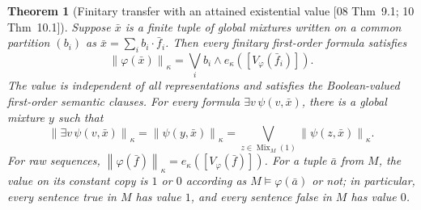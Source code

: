 \documentclass[11pt,letterpaper]{article}
\newtheorem{theorem}{Theorem}[section]
\theoremstyle{definition}
\theoremstyle{remark}
\newcommand{\Mix}{\operatorname{Mix}}
\newcommand{\truth}[1]{\left\lVert #1\right\rVert}
\newcommand{\src}[1]{\textup{[#1]}}
\begin{document}
\begin{theorem}[Finitary transfer with an attained existential value \src{08 Thm~9.1; 10 Thm~10.1}]
\label{fbc:thm:transfer}
Suppose $\bar x$ is a finite tuple of global mixtures written on a
common partition $(b_i)$ as
$\bar x=\sum_i b_i\cdot\bar f_i$. Then every finitary first-order
formula satisfies
\begin{equation}\label{fbc:eq:los-mixing}
 \truth{\varphi(\bar x)}_\kappa
 =\bigvee_i b_i\wedge
       e_\kappa([V_\varphi(\bar f_i)]).
\end{equation}
The value is independent of all representations and satisfies the
Boolean-valued first-order semantic clauses. For every formula
$\exists v\,\psi(v,\bar x)$, there is a global mixture $y$ such that
\begin{equation}\label{fbc:eq:maximum}
 \truth{\exists v\,\psi(v,\bar x)}_\kappa
       =\truth{\psi(y,\bar x)}_\kappa
       =\bigvee_{z\in\Mix_M(1)}\truth{\psi(z,\bar x)}_\kappa.
\end{equation}
For raw sequences, $\truth{\varphi(\bar f)}_\kappa=e_\kappa([V_\varphi(\bar f)])$.
For a tuple $\bar a$ from $M$, the value on its constant copy is $1$ or
$0$ according as $M\models\varphi(\bar a)$ or not; in particular, every
sentence true in $M$ has value $1$, and every sentence false in $M$ has
value $0$.
\end{theorem}
\end{document}
